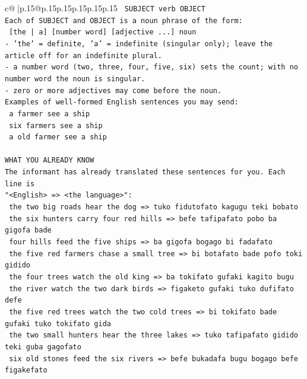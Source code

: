\documentclass{article}
\begin{document}
{\begin{supertabular}{c@{$\;$}|p{.15\linewidth}@{}p{.15\linewidth}p{.15\linewidth}p{.15\linewidth}p{.15\linewidth}p{.15\linewidth}}
{{{\texttt{    SUBJECT  verb  OBJECT} \\
\texttt{Each of SUBJECT and OBJECT is a noun phrase of the form:} \\
\texttt{    {[}the | a{]}  {[}number word{]}  {[}adjective ...{]}  noun} \\
\texttt{{-} 'the' = definite, 'a' = indefinite (singular only); leave the article off for an indefinite plural.} \\
\texttt{{-} a number word (two, three, four, five, six) sets the count; with no number word the noun is singular.} \\
\texttt{{-} zero or more adjectives may come before the noun.} \\
\texttt{Examples of well{-}formed English sentences you may send:} \\
\texttt{    a farmer see a ship} \\
\texttt{    six farmers see a ship} \\
\texttt{    a old farmer see a ship} \\
\\ 
\texttt{WHAT YOU ALREADY KNOW} \\
\texttt{The informant has already translated these sentences for you. Each line is} \\
\texttt{"<English>  =>  <the language>":} \\
\texttt{    the two big roads hear the dog  =>  tuko fidutofato kagugu teki bobato} \\
\texttt{    the six hunters carry four red hills  =>  befe tafipafato pobo ba gigofa bade} \\
\texttt{    four hills feed the five ships  =>  ba gigofa bogago bi fadafato} \\
\texttt{    the five red farmers chase a small tree  =>  bi botafato bade pofo toki gidido} \\
\texttt{    the four trees watch the old king  =>  ba tokifato gufaki kagito bugu} \\
\texttt{    the river watch the two dark birds  =>  figaketo gufaki tuko dufifato defe} \\
\texttt{    the five red trees watch the two cold trees  =>  bi tokifato bade gufaki tuko tokifato gida} \\
\texttt{    the two small hunters hear the three lakes  =>  tuko tafipafato gidido teki guba gagofato} \\
\texttt{    six old stones feed the six rivers  =>  befe bukadafa bugu bogago befe figakefato} \\
}}}
\end{supertabular}}
\end{document}

